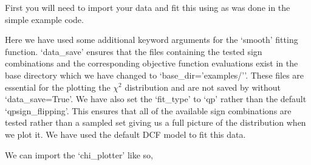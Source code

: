 \documentclass[letterpaper,10pt,english]{sphinxmanual}
\begin{document}
First you will need to import your data and fit this using  as
was done in the simple example code.

\begin{sphinxVerbatim}[commandchars=\\\{\}]
   

  
  

   

  
     
   
\end{sphinxVerbatim}

Here we have used some additional keyword arguments for the ‘smooth’ fitting
function. ‘data\_save’ ensures that the files containing the tested sign combinations
and the corresponding objective function evaluations exist in the base directory
which we have changed to ‘base\_dir=’examples/’’. These files are essential for
the plotting the \({\chi^2}\) distribution and are not saved by 
without ‘data\_save=True’. We have also set the ‘fit\_type’ to ‘qp’ rather than the
default ‘qp\sphinxhyphen{}sign\_flipping’. This ensures that all of the available sign
combinations are tested rather than a sampled set giving us a full picture of the
distribution when we plot it. We have used the default DCF model to fit this data.

We can import the ‘chi\_plotter’ like so,

\begin{sphinxVerbatim}[commandchars=\\\{\}]
   
\end{sphinxVerbatim}
\end{document}
